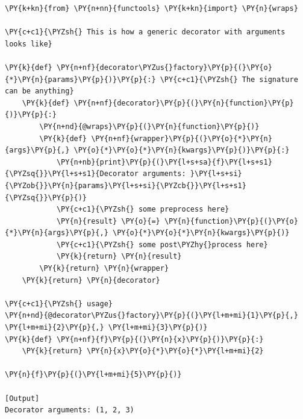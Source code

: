 \begin{Verbatim}[label=\makebox{\url{https://github.com/lucabaldini/cmepda/tree/master/slides/latex/snippets/decorator\_factory.py}},commandchars=\\\{\}]
\PY{k+kn}{from} \PY{n+nn}{functools} \PY{k+kn}{import} \PY{n}{wraps}

\PY{c+c1}{\PYZsh{} This is how a generic decorator with arguments looks like}

\PY{k}{def} \PY{n+nf}{decorator\PYZus{}factory}\PY{p}{(}\PY{o}{*}\PY{n}{params}\PY{p}{)}\PY{p}{:} \PY{c+c1}{\PYZsh{} The signature can be anything}
    \PY{k}{def} \PY{n+nf}{decorator}\PY{p}{(}\PY{n}{function}\PY{p}{)}\PY{p}{:}
        \PY{n+nd}{@wraps}\PY{p}{(}\PY{n}{function}\PY{p}{)}
        \PY{k}{def} \PY{n+nf}{wrapper}\PY{p}{(}\PY{o}{*}\PY{n}{args}\PY{p}{,} \PY{o}{*}\PY{o}{*}\PY{n}{kwargs}\PY{p}{)}\PY{p}{:}
            \PY{n+nb}{print}\PY{p}{(}\PY{l+s+sa}{f}\PY{l+s+s1}{\PYZsq{}}\PY{l+s+s1}{Decorator arguments: }\PY{l+s+si}{\PYZob{}}\PY{n}{params}\PY{l+s+si}{\PYZcb{}}\PY{l+s+s1}{\PYZsq{}}\PY{p}{)}
            \PY{c+c1}{\PYZsh{} some preprocess here}
            \PY{n}{result} \PY{o}{=} \PY{n}{function}\PY{p}{(}\PY{o}{*}\PY{n}{args}\PY{p}{,} \PY{o}{*}\PY{o}{*}\PY{n}{kwargs}\PY{p}{)}
            \PY{c+c1}{\PYZsh{} some post\PYZhy{}process here}
            \PY{k}{return} \PY{n}{result}
        \PY{k}{return} \PY{n}{wrapper}
    \PY{k}{return} \PY{n}{decorator}

\PY{c+c1}{\PYZsh{} usage}
\PY{n+nd}{@decorator\PYZus{}factory}\PY{p}{(}\PY{l+m+mi}{1}\PY{p}{,} \PY{l+m+mi}{2}\PY{p}{,} \PY{l+m+mi}{3}\PY{p}{)}
\PY{k}{def} \PY{n+nf}{f}\PY{p}{(}\PY{n}{x}\PY{p}{)}\PY{p}{:}
    \PY{k}{return} \PY{n}{x}\PY{o}{*}\PY{o}{*}\PY{l+m+mi}{2}

\PY{n}{f}\PY{p}{(}\PY{l+m+mi}{5}\PY{p}{)}

[Output]
Decorator arguments: (1, 2, 3)
\end{Verbatim}